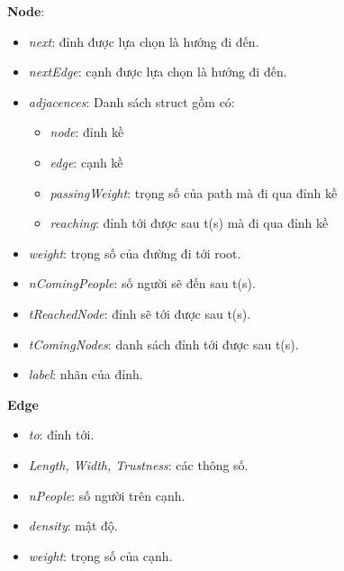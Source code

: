     
    \textbf{Node}: 
    \begin{itemize}
        \item \textit{next}: đỉnh được lựa chọn là hướng đi đến.
        \item \textit{nextEdge}: cạnh được lựa chọn là hướng đi đến.
        \item \textit{adjacences}: Danh sách struct gồm có:
        \begin{itemize}
            \item \textit{node}: đỉnh kề
            \item \textit{edge}: cạnh kề
            \item \textit{passingWeight}: trọng số của path mà đi qua đỉnh kề 
            \item \textit{reaching}: đỉnh tới được sau t(s) mà đi qua đỉnh 
            kề
        \end{itemize}    
        \item \textit{weight}: trọng số của đường đi tới root.
        \item \textit{nComingPeople}: số người sẽ đến sau t(s).
        \item \textit{tReachedNode}: đỉnh sẽ tới được sau t(s).
        \item \textit{tComingNodes}: danh sách đỉnh tới được sau t(s).
        \item \textit{label}: nhãn của đỉnh.
    \end{itemize}
    \textbf{Edge}
    \begin{itemize}
        \item \textit{to}: đỉnh tới.
        \item \textit{Length, Width, Trustness}: các thông số.
        \item \textit{nPeople}: số người trên cạnh.
        \item \textit{density}: mật độ.
        \item \textit{weight}: trọng số của cạnh.
    \end{itemize}
